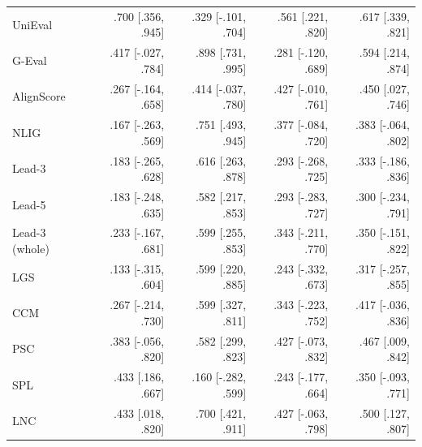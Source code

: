 \begin{table}[t]
\begin{tabular}{@{}lrrrr@{}}
UniEval & .700 {\scriptsize [.356, .945]} & .329 {\scriptsize [-.101, .704]} & .561 {\scriptsize [.221, .820]} & .617 {\scriptsize [.339, .821]} \\
G-Eval & .417 {\scriptsize [-.027, .784]} & .898 {\scriptsize [.731, .995]} & .281 {\scriptsize [-.120, .689]} & .594 {\scriptsize [.214, .874]} \\
AlignScore & .267 {\scriptsize [-.164, .658]} & .414 {\scriptsize [-.037, .780]} & .427 {\scriptsize [-.010, .761]} & .450 {\scriptsize [.027, .746]} \\
NLIG & .167 {\scriptsize [-.263, .569]} & .751 {\scriptsize [.493, .945]} & .377 {\scriptsize [-.084, .720]} & .383 {\scriptsize [-.064, .802]} \\
Lead-3 & .183 {\scriptsize [-.265, .628]} & .616 {\scriptsize [.263, .878]} & .293 {\scriptsize [-.268, .725]} & .333 {\scriptsize [-.186, .836]} \\
Lead-5 & .183 {\scriptsize [-.248, .635]} & .582 {\scriptsize [.217, .853]} & .293 {\scriptsize [-.283, .727]} & .300 {\scriptsize [-.234, .791]} \\
Lead-3 (whole) & .233 {\scriptsize [-.167, .681]} & .599 {\scriptsize [.255, .853]} & .343 {\scriptsize [-.211, .770]} & .350 {\scriptsize [-.151, .822]} \\
LGS & .133 {\scriptsize [-.315, .604]} & .599 {\scriptsize [.220, .885]} & .243 {\scriptsize [-.332, .673]} & .317 {\scriptsize [-.257, .855]} \\
CCM & .267 {\scriptsize [-.214, .730]} & .599 {\scriptsize [.327, .811]} & .343 {\scriptsize [-.223, .752]} & .417 {\scriptsize [-.036, .836]} \\
PSC & .383 {\scriptsize [-.056, .820]} & .582 {\scriptsize [.299, .823]} & .427 {\scriptsize [-.073, .832]} & .467 {\scriptsize [.009, .842]} \\
SPL & .433 {\scriptsize [.186, .667]} & .160 {\scriptsize [-.282, .599]} & .243 {\scriptsize [-.177, .664]} & .350 {\scriptsize [-.093, .771]} \\
LNC & .433 {\scriptsize [.018, .820]} & .700 {\scriptsize [.421, .911]} & .427 {\scriptsize [-.063, .798]} & .500 {\scriptsize [.127, .807]} \\
\bottomrule
\end{tabular}
\end{table}
